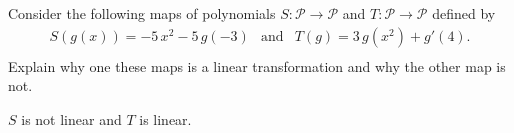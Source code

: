 
\begin{exerciseStatement}


Consider the following maps of polynomials \(S:\mathcal{P}\rightarrow\mathcal{P}\) and \(T:\mathcal{P}\rightarrow\mathcal{P}\) defined by 
\begin{align*} S(g(x))= -5 \, x^{2} - 5 \, g\left(-3\right)  & \text{and} & T(g)= 3 \, g\left(x^{2}\right) + g'\left(4\right) . \\ \end{align*}
             Explain why one these maps is a linear transformation and why the other map is not. 


\end{exerciseStatement}
    
\begin{exerciseAnswer} 


\(S\) is not linear and \(T\) is linear.


\end{exerciseAnswer}
    
